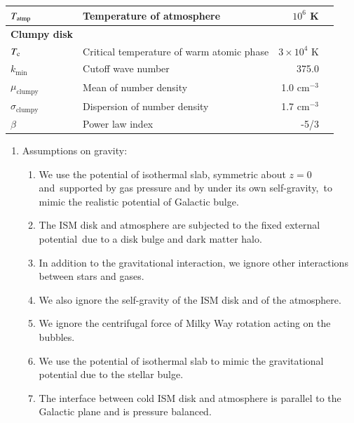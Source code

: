 \documentclass[twocolumn]{aastex631}
\begin{document}
\begin{table}[t]
\begin{tabular}{@{}llrc@{}}
$T_{\text{\text{atmp}}}$                                     & Temperature of atmosphere                 & $10^{6}$ K                           \\ \hline
{\bf Clumpy disk }\citep{Wagner2012}                         &                                           &                                      \\
$T_{\text{\text{c}}}$                                        & Critical temperature of warm atomic phase & $3\times 10^{4}$ K                   \\
$k_{\text{min}}$                                             & Cutoff wave number                        & 375.0                                \\
$\mu_{\text{clumpy}}$                                        & Mean of number density                    & 1.0 $\text{cm}^{-3}$                 \\
$\sigma_{\text{clumpy}}$                                     & Dispersion of number density              & 1.7 $\text{cm}^{-3}$                 \\
$\beta$                                                      & Power law index                           & -5/3                                 \\ \midrule
\end{tabular}
\end{table}


\begin{enumerate}
  \item Assumptions on gravity:
    \begin{enumerate}
      \item We use the potential of isothermal slab, symmetric about $z=0$ and\
            supported by gas pressure and by under its own self-gravity,\
            to mimic the realistic potential of Galactic bulge.
      \item The ISM disk and atmosphere are subjected to the fixed external potential\
            due to a disk bulge and dark matter halo.
      \item In addition to the gravitational interaction, we ignore other interactions between stars and gases.
      \item We also ignore the self-gravity of the ISM disk and of the atmosphere.
      \item We ignore the centrifugal force of Milky Way rotation acting on the bubbles.
      \item We use the potential of isothermal slab to mimic the gravitational potential due to the stellar bulge.
      \item The interface between cold ISM disk and atmosphere is parallel to the Galactic plane and is pressure balanced.
    \end{enumerate}
\end{enumerate}
\end{document}
